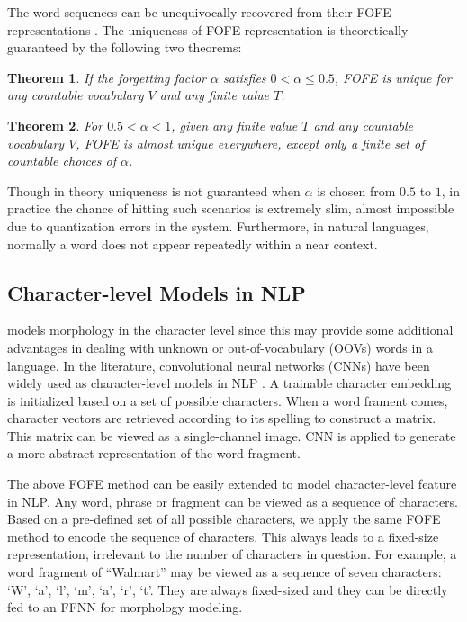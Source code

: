 \documentclass[11pt,a4paper]{article}
\newtheorem{theorem}{Theorem}
\begin{document}
The word sequences can be unequivocally recovered from their FOFE representations \cite{zhang2015fixed}.
The uniqueness of FOFE representation is theoretically guaranteed
by the following two theorems: 
\begin{theorem}
	If the forgetting factor $\alpha$ satisfies $0 < \alpha \leq 0.5$, FOFE is unique for any countable vocabulary $V$ and any finite value $T$.
\end{theorem}
\begin{theorem}
	For $0.5 < \alpha < 1 $, given any finite value $T$ and any countable vocabulary $V$,
	FOFE is almost unique everywhere, except only a finite set of countable choices of $\alpha$.
\end{theorem}
Though in theory uniqueness is not guaranteed when $\alpha$ is chosen from $0.5$ to $1$, 
in practice the chance of hitting such scenarios is extremely slim, almost impossible due to quantization errors in the system. 
Furthermore, in natural languages, normally a word does not appear repeatedly within a near context. 


\subsection {Character-level Models in NLP}
\label{subsec_char_feature}

 models morphology in the character level since this may provide some additional advantages in dealing with unknown or out-of-vocabulary (OOVs) words in a language. In the literature, convolutional neural networks (CNNs) have been widely used as character-level models in NLP \cite{kim2015character}. 
A trainable character embedding is initialized based on a set of possible characters. When a word frament comes, character vectors are retrieved according to its spelling to construct a matrix. This matrix can be viewed as a single-channel image. CNN is applied to generate a more abstract representation of the word fragment.

The above FOFE method can be easily extended to model character-level feature in NLP. Any word, phrase or fragment can be viewed as a sequence of characters. Based on a pre-defined set of all possible characters, we apply the same FOFE method to encode the sequence of characters. This always leads to a fixed-size representation, irrelevant to the number of characters in question. 
For example, a word fragment of ``Walmart'' may be viewed as a 
sequence of seven characters: `W', `a', `l', `m', `a', `r', `t'.
They are
always fixed-sized and they can be directly fed to an FFNN for morphology modeling. 
\end{document}

